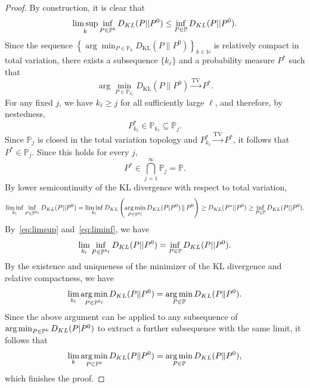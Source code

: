 \documentclass[10pt,a4paper]{amsart}
\DeclareMathOperator*{\argmin}{arg\,min}
\newcommand{\p}{\mathbb{P}}
\begin{document}
\begin{proof}
By construction, it is clear that
\begin{equation}\label{eq:limsup}
    \limsup_{k} \inf_{P \in \p^{k}} D_{\rm KL}(P || P^{0}) \le \inf_{P \in \p} D_{\rm KL}(P || P^{0}).
\end{equation}
Since the sequence
$\left\{
\arg\min_{P\in\p_k}
D_{\mathrm{KL}}(P\|P^0)
\right\}_{k\in\mathbb{N}}$
is relatively compact in total variation, there exists a subsequence $\{k_\ell\}$ and a probability measure $P^\ast$ such that
\[
\arg\min_{P\in\p_{k_\ell}}
D_{\mathrm{KL}}(P\|P^0)
\xrightarrow{\mathrm{TV}}
P^\ast.
\]
For any fixed $j$, we have $k_\ell\geq j$ for all sufficiently large
$\ell$, and therefore, by nestedness,
\[
P_{k_\ell}^\ast\in\p_{k_\ell}\subseteq\p_j.
\]
Since $\p_j$ is closed in the total variation topology and
$P_{k_\ell}^\ast\xrightarrow{\mathrm{TV}}P^\ast$, it follows that
$P^\ast\in\p_j$. Since this holds for every $j$,
\[
P^\ast\in\bigcap_{j=1}^{\infty}\p_j=\p.
\]
By lower semicontinuity of the KL divergence with respect to total variation,
\begin{equation}\label{eq:liminf}
    \liminf_{k_{l}} \inf_{P \in \p^{k_{l}}} D_{\rm KL}(P || P^{0}) = \liminf_{k_{l}}D_{\rm KL}\left(\argmin_{P \in \p^{k_{l}}}D_{\rm KL}(P | P^{0})\, \| \, P^{0}\right)  \ge  D_{\rm KL}(P^{*} || P^{0}) \ge \inf_{P \in \p} D_{\rm KL}(P || P^{0}).
\end{equation}
By~\eqref{eq:limsup} and~\eqref{eq:liminf}, we have
\begin{equation*}
    \lim_{k_{l}} \inf_{P \in \p^{k_{l}}} D_{\rm KL}(P || P^{0}) = \inf_{P \in \p} D_{\rm KL}(P || P^{0}).
\end{equation*}
By the existence and uniqueness of the minimizer of the KL divergence and relative compactness, we have
\begin{equation*}
    \lim_{k_{l}} \argmin_{P \in \p^{k_{l}}}D_{\rm KL}(P \| P^{0}) = \argmin_{P \in \p}D_{\rm KL}(P \| P^{0}).
\end{equation*}
Since the above argument can be applied to any subsequence of $\argmin_{P \in \p^{k}}D_{\rm KL}(P | P^{0})$ to extract a further subsequence with the same limit, it follows that
\begin{equation*}
    \lim_{k} \argmin_{P \in \p^{k}}D_{\rm KL}(P \| P^{0}) = \argmin_{P \in \p}D_{\rm KL}(P \| P^{0}),
\end{equation*}
which finishes the proof.
\end{proof}
\end{document}
